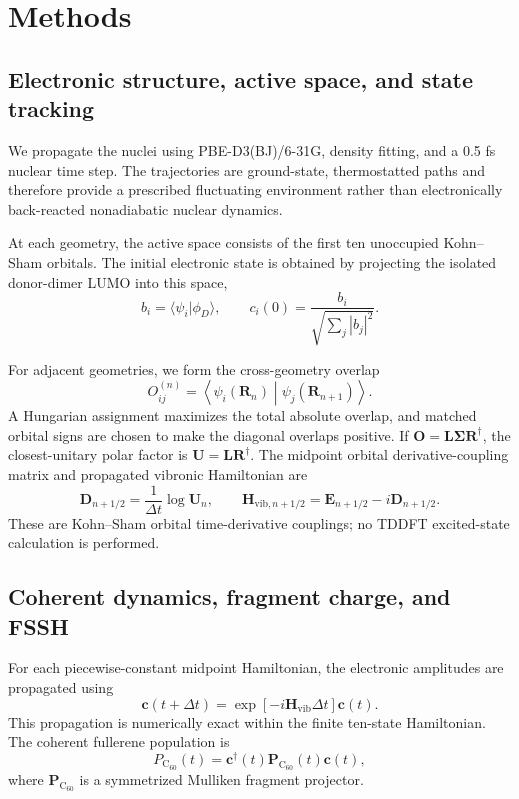 \documentclass[11pt]{article}
\newcommand{\Csixty}{\mathrm{C}_{60}}
\begin{document}
\section{Methods}
\subsection{Electronic structure, active space, and state tracking}
We propagate the nuclei using PBE-D3(BJ)/6-31G, density fitting, and a 0.5 fs nuclear time step. The trajectories are ground-state, thermostatted paths and therefore provide a prescribed fluctuating environment rather than electronically back-reacted nonadiabatic nuclear dynamics.

At each geometry, the active space consists of the first ten unoccupied Kohn--Sham orbitals. The initial electronic state is obtained by projecting the isolated donor-dimer LUMO into this space,
\begin{equation}
 b_i=\langle\psi_i|\phi_D\rangle,
 \qquad
 c_i(0)=\frac{b_i}{\sqrt{\sum_j|b_j|^2}}.
\end{equation}

For adjacent geometries, we form the cross-geometry overlap
\begin{equation}
 O_{ij}^{(n)}=\left\langle\psi_i(\bm R_n)\middle|\psi_j(\bm R_{n+1})\right\rangle.
\end{equation}
A Hungarian assignment maximizes the total absolute overlap, and matched orbital signs are chosen to make the diagonal overlaps positive. If $\bm O=\bm L\bm\Sigma\bm R^\dagger$, the closest-unitary polar factor is $\bm U=\bm L\bm R^\dagger$. The midpoint orbital derivative-coupling matrix and propagated vibronic Hamiltonian are
\begin{equation}
 \bm D_{n+1/2}=\frac{1}{\Delta t}\log\bm U_n,
 \qquad
 \bm H_{\mathrm{vib},n+1/2}=\bm E_{n+1/2}-i\bm D_{n+1/2}.
\end{equation}
These are Kohn--Sham orbital time-derivative couplings; no TDDFT excited-state calculation is performed.

\subsection{Coherent dynamics, fragment charge, and FSSH}
For each piecewise-constant midpoint Hamiltonian, the electronic amplitudes are propagated using
\begin{equation}
 \bm c(t+\Delta t)=\exp[-i\bm H_{\mathrm{vib}}\Delta t]\bm c(t).
\end{equation}
This propagation is numerically exact within the finite ten-state Hamiltonian. The coherent fullerene population is
\begin{equation}
 P_{\Csixty}(t)=\bm c^\dagger(t)\bm P_{\Csixty}(t)\bm c(t),
\end{equation}
where $\bm P_{\Csixty}$ is a symmetrized Mulliken fragment projector.
\end{document}
